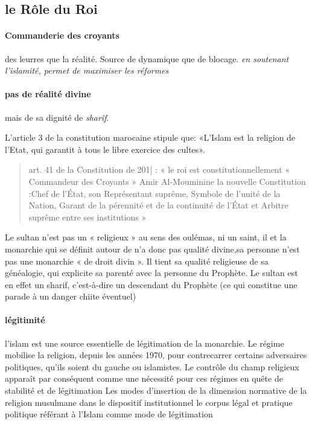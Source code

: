 \subsection{le Rôle du Roi}
\paragraph{Commanderie des croyants} des leurres que la réalité. Source de dynamique que de blocage. \textit{en soutenant l'islamité, permet de maximiser les réformes}

\paragraph{pas de réalité divine} mais de sa dignité de \textit{sharîf}. 


L'article 3 de la constitution marocaine stipule que: «L'Islam est la religion de l'Etat, qui garantit à tous le libre exercice des cultes».
\begin{quote}
     art. 41 de la Constitution de 201| : « le roi est constitutionnellement « Commandeur des Croyants » Amir Al-Mouminine   la nouvelle Constitution :Chef de l'État, son Représentant suprême, Symbole de l'unité de la Nation, Garant de la pérennité et de la continuité de l'État et Arbitre suprême entre ses institutions »


 
\end{quote}
 Le sultan n'est pas un « religieux » au sens des oulémas, ni un saint, il et la monarchie qui se définit autour de n'a donc pas qualité divine,sa personne n'est pas une monarchie « de droit divin ».
  Il tient sa qualité religieuse de sa généalogie, qui explicite sa parenté avec la personne du Prophète.
  Le sultan est en effet un sharif, c'est-à-dire un descendant du Prophète (ce qui constitue une parade à un danger chiite éventuel)

\paragraph{légitimité}

 l'islam est une source essentielle de légitimation de la monarchie.
  Le régime mobilise la religion, depuis les années 1970, pour contrecarrer certains adversaires politiques, qu'ils soient du gauche ou islamistes.
  Le contrôle du champ religieux apparaît par conséquent comme une nécessité pour ces régimes en quête de stabilité et de légitimation   Les modes d'insertion de la dimension normative de la religion musulmane dans le dispositif institutionnel le corpus légal et pratique politique référant à l'Islam comme mode de légitimation




